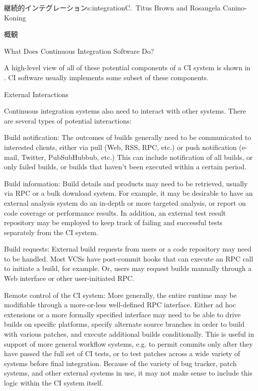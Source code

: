 \begin{aosachapter}{継続的インテグレーション}{s:integration}{C.\ Titus Brown and Rosangela Canino-Koning}
\begin{aosasect1}{概観}
\begin{aosasect2}{What Does Continuous Integration Software Do?}
\begin{aosadescription}
\end{aosadescription}

A high-level view of all of these potential components of a CI system
is shown in . CI software usually
implements some subset of these components.

\end{aosasect2}

\begin{aosasect2}{External Interactions}

Continuous integration systems also need to interact with other
systems. There are several types of potential interactions:

\begin{aosadescription}

  \item{Build notification}: The outcomes of builds generally
  need to be communicated to interested clients, either via pull
  (Web, RSS, RPC, etc.) or push notification (e-mail, Twitter,
  PubSubHubbub, etc.) This can include notification of all builds,
  or only failed builds, or builds that haven't been executed within
  a certain period.

  \item{Build information}: Build details and products may need
  to be retrieved, usually via RPC or a bulk download system. For
  example, it may be desirable to have an external analysis system
  do an in-depth or more targeted analysis, or report on code
  coverage or performance results. In addition, an external test
  result repository may be employed to keep track of failing and
  successful tests separately from the CI system.

  \item{Build requests}: External build requests from users or a
  code repository may need to be handled. Most VCSs have post-commit
  hooks that can execute an RPC call to initiate a build, for
  example. Or, users may request builds manually through a Web
  interface or other user-initiated RPC.

  \item{Remote control of the CI system}: More generally, the
  entire runtime may be modifiable through a more-or-less
  well-defined RPC interface. Either ad hoc extensions or a
  more formally specified interface may need to be able to drive
  builds on specific platforms, specify alternate source branches in order to
  build with various patches, and execute additional builds
  conditionally. This is useful in support of more general workflow
  systems, e.g. to permit commits only after they have passed the
  full set of CI tests, or to test patches across a wide variety of
  systems before final integration. Because of the variety of bug
  tracker, patch systems, and other external systems in use, it may
  not make sense to include this logic within the CI system itself.


\end{aosadescription}
\end{aosasect2}
\end{aosasect1}
\end{aosachapter}
